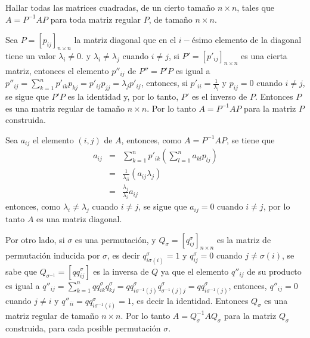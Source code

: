 \begin{enunciado}
 Hallar todas las matrices cuadradas, de un cierto tama\~no $n\times n$, tales que $A = P^{-1}AP$ para toda matriz regular $P$, de tama\~no $n\times n$.
\end{enunciado}

\begin{solucion}
 Sea $P = [p_{ij}]_{n\times n}$ la matriz diagonal que en el $i-$\'esimo elemento de la diagonal tiene un valor $\lambda_i \neq 0$. y $\lambda_i \neq \lambda_j$ cuando $i\neq j$, si $P' = [p'_{ij}]_{n\times n}$ es una cierta matriz, entonces el elemento $p''_{ij}$ de $P'' = P'P$ es igual a $p''_{ij} = \sum_{k=1}^n p'_{ik}p_{kj}  = p'_{ij}p_{jj} = \lambda_{j}p'_{ij}$, entonces, si $p'_{ii} = \frac{1}{\lambda_{i}}$ y $p_{ij} = 0$ cuando $i\neq j$, se sigue que $P'P$ es la identidad y, por lo tanto, $P'$ es el inverso de $P$.
 Entonces $P$ es una matriz regular de tama\~no $n\times n$. Por lo tanto $A = P^{-1}AP$ para la matriz $P$ construida.
 \par 
 Sea $a_{ij}$ el elemento $(i,j)$ de $A$, entonces, como $A = P^{-1}AP$, se tiene que
 \begin{eqnarray*}
  a_{ij} & = & \sum_{k=1}^{n} p'_{ik}\left( \sum_{l = 1}^{n} a_{kl}p_{lj} \right) \\
  & = & \frac{1}{\lambda_{ii}} \left( a_{ij}\lambda_{j} \right) \\
  & = & \frac{\lambda_j}{\lambda_i} a_{ij}
 \end{eqnarray*}
 entonces, como $\lambda_i \neq \lambda_j$ cuando $i \neq j$, se sigue que $a_{ij} = 0$ cuando $i\neq j$, por lo tanto $A$ es una matriz diagonal.
 \par 
 Por otro lado, si $\sigma$ es una permutaci\'on, y $Q_{\sigma} = [q^{\sigma}_{ij}]_{n\times n}$ es la matriz de permutaci\'on inducida por $\sigma$, es decir $q^{\sigma}_{i\sigma(i)} = 1$ y $q^{\sigma}_{ij} = 0$ cuando $j\neq \sigma(i)$, se sabe que $Q_{\sigma^{-1}} = [qq^{\sigma}_{ij}]$ es la inversa de $Q$
 ya que el elemento $q''_{ij}$ de su producto es igual a $q''_{ij} = \sum_{k=1}^n qq^{\sigma}_{ik} q^\sigma_{kj} = qq^{\sigma}_{i\sigma^{-1}(j)} q^{\sigma}_{\sigma^{-1}(j) j} = qq^{\sigma}_{i\sigma^{-1}(j)}$, entonces, $q''_{ij} = 0$ cuando $j \neq i$ y $q''_{ii} = qq^{\sigma}_{i\sigma^{-1}(i)} = 1$, es decir la identidad. Entonces $Q_{\sigma}$ es una matriz regular de tama\~no $n\times n$. Por lo tanto $A = Q^{-1}_{\sigma}AQ_{\sigma}$ para la matriz $Q_{\sigma}$ construida, para cada posible permutaci\'on $\sigma$.
 \par 

\end{solucion}
